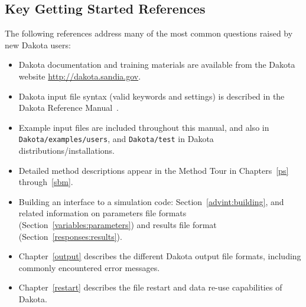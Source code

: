 \subsection{Key Getting Started References}\label{tutorial:keyrefs}

The following references address many of the most common questions
raised by new Dakota users:
\begin{itemize}
\item Dakota documentation and training materials are available from
  the Dakota website \url{http://dakota.sandia.gov}.

\item Dakota input file syntax (valid keywords and settings) is
  described in the Dakota Reference Manual~\cite{RefMan}.

\item Example input files are included throughout this manual, and
  also in {\tt Dakota/examples/users}, 
  \newline and {\tt Dakota/test} in Dakota distributions/installations.

\item Detailed method descriptions appear in the Method Tour in
  Chapters~\ref{ps} through~\ref{sbm}.

\item Building an interface to a simulation code:
  Section~\ref{advint:building}, and related information on parameters
  file formats (Section~\ref{variables:parameters}) and results file
  format (Section~\ref{responses:results}).

\item Chapter~\ref{output} describes the different Dakota output file
  formats, including commonly encountered error messages.

\item Chapter~\ref{restart} describes the file restart and data re-use
  capabilities of Dakota.

\end{itemize}
